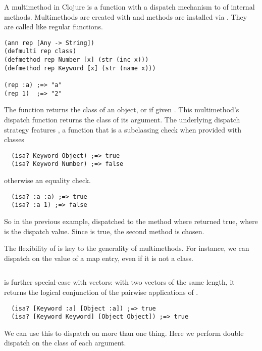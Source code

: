 A multimethod in Clojure is a function with a dispatch mechanism to
of internal methods. Multimethods are created with {}
and methods are installed via {}.
They are called like regular functions.

\begin{verbatim}
(ann rep [Any -> String])
(defmulti rep class)
(defmethod rep Number [x] (str (inc x)))
(defmethod rep Keyword [x] (str (name x)))

(rep :a) ;=> "a"
(rep 1)  ;=> "2"
\end{verbatim}

The  function returns the class of an object, or 
if given . This multimethod's dispatch function returns the class of its
argument. The underlying dispatch strategy features , a function
that is a subclassing check when provided with classes

\begin{verbatim}
  (isa? Keyword Object) ;=> true
  (isa? Keyword Number) ;=> false
\end{verbatim}

otherwise an equality check.

\begin{verbatim}
  (isa? :a :a) ;=> true
  (isa? :a 1) ;=> false
\end{verbatim}

So in the previous example,  dispatched to the method
where  returned true, where  is the dispatch value.
Since  is true, the second method is chosen.

The flexibility of  is key to the generality of multimethods. 
For instance, we can dispatch on the value of
a map entry, even if it is not a class.

\inputminted[firstline=4,lastline=23]{clojure}{code/demo/src/demo/eg5.clj}

 is further special-case with vectors: with two vectors of the
same length, it returns the logical conjunction of the pairwise applications
of .

\begin{verbatim}
  (isa? [Keyword :a] [Object :a]) ;=> true
  (isa? [Keyword Keyword] [Object Object]) ;=> true
\end{verbatim}

We can use this to dispatch on more than one thing. Here we perform
double dispatch on the class of each argument.

